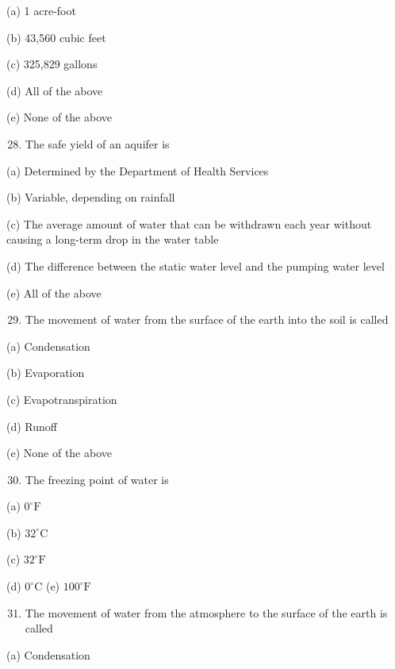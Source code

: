 \documentclass[10pt]{article}
\begin{document}
(a) 1 acre-foot

(b) 43,560 cubic feet

(c) 325,829 gallons

(d) All of the above

(e) None of the above

\begin{enumerate}
  \setcounter{enumi}{27}
  \item The safe yield of an aquifer is
\end{enumerate}

(a) Determined by the Department of Health Services

(b) Variable, depending on rainfall

(c) The average amount of water that can be withdrawn each year without causing a long-term drop in the water table

(d) The difference between the static water level and the pumping water level

(e) All of the above

\begin{enumerate}
  \setcounter{enumi}{28}
  \item The movement of water from the surface of the earth into the soil is called
\end{enumerate}

(a) Condensation

(b) Evaporation

(c) Evapotranspiration

(d) Runoff

(e) None of the above

\begin{enumerate}
  \setcounter{enumi}{29}
  \item The freezing point of water is
\end{enumerate}

(a) $0^{\circ} \mathrm{F}$

(b) $32^{\circ} \mathrm{C}$

(c) $32^{\circ} \mathrm{F}$

(d) $0^{\circ} \mathrm{C}$ (e) $100^{\circ} \mathrm{F}$

\begin{enumerate}
  \setcounter{enumi}{30}
  \item The movement of water from the atmosphere to the surface of the earth is called
\end{enumerate}

(a) Condensation
\end{document}
